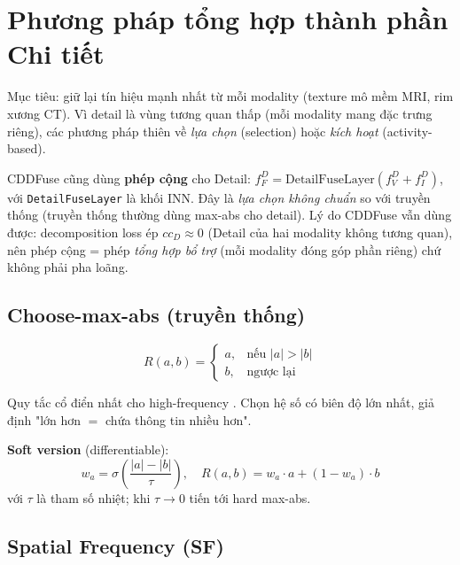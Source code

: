 \documentclass[12pt,a4paper]{article}
\begin{document}
\section{Phương pháp tổng hợp thành phần Chi tiết}
\label{sec:detail-fusion}

Mục tiêu: giữ lại tín hiệu mạnh nhất từ mỗi modality (texture mô mềm MRI, rim xương CT). Vì detail là vùng tương quan thấp (mỗi modality mang đặc trưng riêng), các phương pháp thiên về \emph{lựa chọn} (selection) hoặc \emph{kích hoạt} (activity-based).

\begin{tcolorbox}[colback=blue!5,colframe=blue!50,title=\textbf{CDDFuse dùng cho Detail}]
CDDFuse cũng dùng \textbf{phép cộng} cho Detail: $f^D_F = \mathrm{DetailFuseLayer}(f^D_V + f^D_I)$, với \texttt{DetailFuseLayer} là khối INN. Đây là \emph{lựa chọn không chuẩn} so với truyền thống (truyền thống thường dùng max-abs cho detail). Lý do CDDFuse vẫn dùng được: decomposition loss ép $cc_D \approx 0$ (Detail của hai modality không tương quan), nên phép cộng = phép \emph{tổng hợp bổ trợ} (mỗi modality đóng góp phần riêng) chứ không phải pha loãng.
\end{tcolorbox}

\subsection{Choose-max-abs (truyền thống)}

\begin{equation}
R(a, b) = \begin{cases} a, & \text{nếu } |a| > |b| \\ b, & \text{ngược lại} \end{cases}
\end{equation}

Quy tắc cổ điển nhất cho high-frequency \cite{li1995wavelet}. Chọn hệ số có biên độ lớn nhất, giả định "lớn hơn $=$ chứa thông tin nhiều hơn".

\textbf{Soft version} (differentiable):
\begin{equation}
w_a = \sigma\left(\frac{|a| - |b|}{\tau}\right), \quad R(a, b) = w_a \cdot a + (1 - w_a) \cdot b
\end{equation}
với $\tau$ là tham số nhiệt; khi $\tau \to 0$ tiến tới hard max-abs.

\subsection{Spatial Frequency (SF)}
\end{document}
